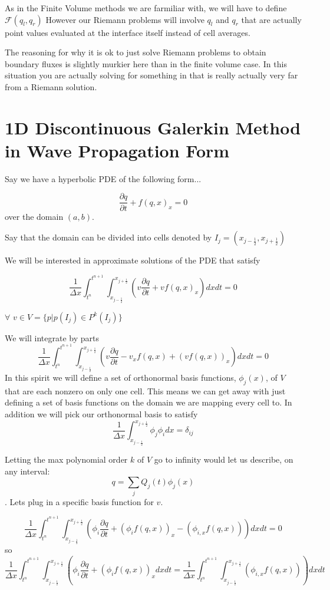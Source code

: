 \documentclass[10]{amsart}
\begin{document}
 As in the Finite Volume methods we are farmiliar with, we will have to define $\mathcal{F}(q_l,q_r)$
 However our Riemann problems will involve $q_l$ and $q_r$ that are actually
 point values evaluated at the interface itself instead of cell
 averages. 
 
 The reasoning for why it is ok to just solve Riemann problems to obtain boundary fluxes is slightly
 murkier here than in the finite volume case. In this situation you are actually solving for something 
 in that is really actually very far from a Riemann solution.
 
 \section{1D Discontinuous Galerkin Method in Wave Propagation Form}
Say we have a hyperbolic PDE of the following form...

$$\frac{\partial q}{\partial t}+f(q,x)_x=0$$
over the domain $(a,b)$.

Say that the domain can be divided into cells denoted by $I_j=(x_{j-\frac{1}{2}},x_{j+\frac{1}{2}})$

 We will be interested in approximate solutions of the PDE that
satisfy

$$\frac{1}{\Delta x}\int_{t^n}^{t^{n+1}}\int_{x_{j-\frac{1}{2}}}^{x_{j+\frac{1}{2}}} (v\frac{\partial q}{\partial t}+v f(q,x)_x)dxdt=0$$

$\forall$ $v \in V=\{p | p(I_j) \in P^k(I_j)\}$

We will integrate by parts
$$\frac{1}{\Delta x}\int_{t^n}^{t^{n+1}}\int_{x_{j-\frac{1}{2}}}^{x_{j+\frac{1}{2}}} 
(v\frac{\partial q}{\partial t}-v_x f(q,x)+(v f(q,x))_x)dxdt=0$$
In this spirit we will define a set of orthonormal basis functions, $\phi_j(x)$, of $V$ that are each nonzero on only one cell.
This means we can get away with just defining a set of basis functions on the domain we are mapping every cell to.
In addition we will pick our orthonormal basis to satisfy
$$\frac{1}{\Delta x}\int_{x_{j-\frac{1}{2}}}^{x_{j+\frac{1}{2}}}  \phi_j \phi_i d x=\delta_{ij}$$

Letting the max polynomial order $k$ of $V$ go to infinity would let us describe, on any interval: 
$$ q=\sum_j Q_j(t) \phi_j (x)$$. Lets plug in a specific basis function for $v$.

$$\frac{1}{\Delta x}\int_{t^n}^{t^{n+1}}\int_{x_{j-\frac{1}{2}}}^{x_{j+\frac{1}{2}}} 
(\phi_i\frac{\partial q}{\partial t}+(\phi_{i} f(q,x))_x-(\phi_{i,x} f(q,x)))dxdt=0$$
so
$$\frac{1}{\Delta x}\int_{t^n}^{t^{n+1}}\int_{x_{j-\frac{1}{2}}}^{x_{j+\frac{1}{2}}} 
(\phi_i\frac{\partial q}{\partial t}+(\phi_{i} f(q,x))_x dxdt
=\frac{1}{\Delta x}\int_{t^n}^{t^{n+1}}\int_{x_{j-\frac{1}{2}}}^{x_{j+\frac{1}{2}}}(\phi_{i,x} f(q,x)))dxdt$$
\end{document}
